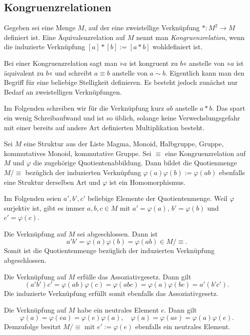 \subsection{Kongruenzrelationen}

\begin{Definition}[Kongruenzrelation]%
\newlinefirst
Gegeben sei eine Menge $M$, auf der eine zweistellige
Verknüpfung $*\colon M^2\to M$ definiert ist. Eine Äquivalenzrelation
auf $M$ nennt man \emph{Kongruenzrelation}, wenn die induzierte Verknüpfung
$[a]*[b]:=[a*b]$ wohldefiniert ist.
\end{Definition}
Bei einer Kongruenzrelation sagt man »$a$ ist kongruent zu $b$«
anstelle von »$a$ ist äquivalent zu $b$« und schreibt $a\equiv b$
anstelle von $a\sim b$. Eigentlich kann man den Begriff für eine
beliebige Stelligkeit definieren. Es besteht jedoch zunächst nur Bedarf
an zweistelligen Verknüpfungen.

Im Folgenden schreiben wir für die Verknüpfung kurz $ab$ anstelle
$a*b$. Das spart ein wenig Schreibaufwand und ist so üblich, solange
keine Verwechslungsgefahr mit einer bereits auf andere Art definierten
Multiplikation besteht.

\begin{Satz}\label{Kongruenz-Quotient}
Sei $M$ eine Struktur aus der Liste Magma, Monoid, Halbgruppe,
Gruppe, kommutatives Monoid, kommutative Gruppe. Sei $\equiv$ eine
Kongruenzrelation auf $M$ und $\varphi$ die zugehörige
Quotientenabbildung. Dann bildet die Quotienmenge $M/\equiv$
bezüglich der induzierten Verknüpfung $\varphi(a)\varphi(b):=\varphi(ab)$
ebenfalls eine Struktur derselben Art und $\varphi$ ist ein
Homomorphismus.
\end{Satz}
 Im Folgenden seien $a',b',c'$ beliebige Elemente
der Quotientenmenge. Weil $\varphi$ surjektiv ist, gibt es immer
$a,b,c\in M$ mit $a'=\varphi(a)$, $b'=\varphi(b)$ und $c'=\varphi(c)$.

Die Verknüpfung auf $M$ sei abgeschlossen. Dann ist
\[a'b' = \varphi(a)\varphi(b) = \varphi(ab)\in M/\equiv.\]
Somit ist die Quotientenmenge bezüglich der induzierten Verknüpfung
abgeschlossen.

Die Verknüpfung auf $M$ erfülle das Assoziativgesetz. Dann gilt
\[(a'b')c' = \varphi(ab)\varphi(c) = \varphi(abc)
= \varphi(a)\varphi(bc) = a'(b'c').\]
Die induzierte Verknüpfung erfüllt somit ebenfalls das
Assoziativgesetz.

Die Verknüpfung auf $M$ habe ein neutrales Element $e$. Dann gilt
\[\varphi(a)=\varphi(ea) = \varphi(e)\varphi(a),\quad
\varphi(a)=\varphi(ae)=\varphi(a)\varphi(e).\]
Demzufolge besitzt $M/\equiv$ mit $e':=\varphi(e)$ ebenfalls
ein neutrales Element.

